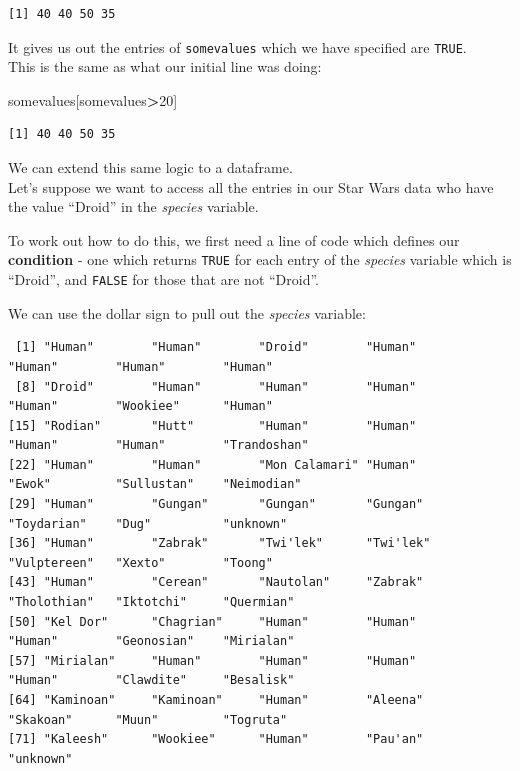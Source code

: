 \documentclass[]{book}
\newenvironment{Shaded}{\begin{snugshade}}{\end{snugshade}}
\newcommand{\DecValTok}[1]{\textcolor[rgb]{0.00,0.00,0.81}{#1}}
\newcommand{\NormalTok}[1]{#1}
\newcommand{\OperatorTok}[1]{\textcolor[rgb]{0.81,0.36,0.00}{\textbf{#1}}}
\begin{document}
\begin{verbatim}
[1] 40 40 50 35
\end{verbatim}

It gives us out the entries of \texttt{somevalues} which we have specified are \texttt{TRUE}.\\
This is the same as what our initial line was doing:

\begin{Shaded}
\begin{Highlighting}[]
\NormalTok{somevalues[somevalues}\OperatorTok{>}\DecValTok{20}\NormalTok{]}
\end{Highlighting}
\end{Shaded}

\begin{verbatim}
[1] 40 40 50 35
\end{verbatim}

We can extend this same logic to a dataframe.\\
Let's suppose we want to access all the entries in our Star Wars data who have the value ``Droid'' in the \emph{species} variable.

To work out how to do this, we first need a line of code which defines our \textbf{condition} - one which returns \texttt{TRUE} for each entry of the \emph{species} variable which is ``Droid'', and \texttt{FALSE} for those that are not ``Droid''.

We can use the dollar sign to pull out the \emph{species} variable:

\begin{Shaded}
\end{Shaded}

\begin{verbatim}
 [1] "Human"        "Human"        "Droid"        "Human"        "Human"        "Human"        "Human"       
 [8] "Droid"        "Human"        "Human"        "Human"        "Human"        "Wookiee"      "Human"       
[15] "Rodian"       "Hutt"         "Human"        "Human"        "Human"        "Human"        "Trandoshan"  
[22] "Human"        "Human"        "Mon Calamari" "Human"        "Ewok"         "Sullustan"    "Neimodian"   
[29] "Human"        "Gungan"       "Gungan"       "Gungan"       "Toydarian"    "Dug"          "unknown"     
[36] "Human"        "Zabrak"       "Twi'lek"      "Twi'lek"      "Vulptereen"   "Xexto"        "Toong"       
[43] "Human"        "Cerean"       "Nautolan"     "Zabrak"       "Tholothian"   "Iktotchi"     "Quermian"    
[50] "Kel Dor"      "Chagrian"     "Human"        "Human"        "Human"        "Geonosian"    "Mirialan"    
[57] "Mirialan"     "Human"        "Human"        "Human"        "Human"        "Clawdite"     "Besalisk"    
[64] "Kaminoan"     "Kaminoan"     "Human"        "Aleena"       "Skakoan"      "Muun"         "Togruta"     
[71] "Kaleesh"      "Wookiee"      "Human"        "Pau'an"       "unknown"     
\end{verbatim}
\end{document}
